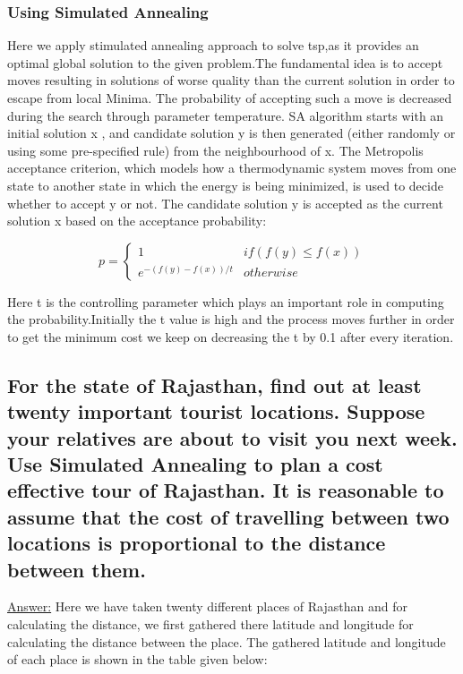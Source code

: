 \documentclass[15pt,journal]{IEEEtran}
\begin{document}
\subsubsection{Using Simulated Annealing}
Here we apply stimulated annealing approach to solve tsp,as it provides an optimal global solution to the given problem.The fundamental idea is to accept moves resulting in solutions of worse quality than the current solution in order to escape from local Minima. The probability of accepting such a move is decreased during the search through parameter temperature. SA algorithm starts with an initial solution x , and candidate solution y is then generated (either randomly or using some pre-specified rule) from the neighbourhood of x. The Metropolis acceptance criterion, which models how a thermodynamic system moves from one state to another state in which the energy is being minimized, is used to decide whether to accept y or not. The candidate solution y is accepted as the current solution x based on the acceptance probability:


\begin{equation}
   p = 
  \begin{cases}
     1 & \text{$if         (f(y) \leq f(x))$} \\
    e{{^{-(f(y)-f(x))/t}}} & \text{$otherwise$}
  \end{cases}
  \label{equation:Metropolis Acceptance Criterion}
\end{equation}


Here t is the controlling parameter which plays an important role in computing the probability.Initially the t value is high and the process moves further in order to get the minimum cost we keep on decreasing the t by 0.1 after every iteration.


\subsection{For the state of Rajasthan, find out at least twenty important tourist locations.  Suppose your relatives are about to visit you next week.  Use Simulated Annealing to plan a cost effective tour of Rajasthan.  It is reasonable to assume that the cost of travelling between two locations is proportional to the distance between them.}
\underline{Answer:}
Here we have taken twenty different places of  Rajasthan and for calculating the distance, we first gathered there latitude and longitude for calculating the distance between the place. The gathered latitude and longitude of each place is shown in the table given below:
\end{document}
